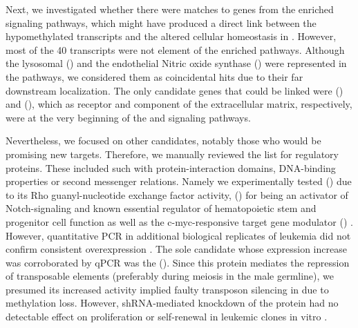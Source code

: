 Next, we investigated whether there were matches to genes from the enriched signaling pathways, which might have produced a direct link between the hypomethylated transcripts and the altered cellular homeostasis in \dnmtchip. However, most of the \num{40} transcripts were not element of the enriched pathways. Although the lysosomal () and the endothelial Nitric oxide synthase () were represented in the pathways, we considered them as coincidental hits due to their far downstream localization. The only candidate genes that could be linked were () and (), which as receptor and component of the extracellular matrix, respectively, were at the very beginning of the  and  signaling pathways.

Nevertheless, we focused on other candidates, notably those who would be promising new targets. Therefore, we manually reviewed the list for regulatory proteins. These included such with protein-interaction domains, DNA-binding properties or second messenger relations. Namely we experimentally tested () due to its Rho guanyl-nucleotide exchange factor activity, () for being an activator of Notch-signaling and known essential regulator of hematopoietic stem and progenitor cell function\cite{Gupta2007} as well as the c-myc-responsive target gene modulator () \cite{Yin1999}. However, quantitative PCR in additional biological replicates of \dnmtchip \mllafnine \kithi leukemia did not confirm consistent overexpression \dns. The sole candidate whose expression increase was corroborated by qPCR was the (). Since this protein mediates the repression of transposable elements (preferably during meiosis in the male germline)\cite{Wenda2017}, we presumed its increased activity implied faulty transposon silencing in \dnmtchip due to methylation loss. However, shRNA-mediated knockdown of the protein had no detectable effect on proliferation or self-renewal in \mllafnine leukemic clones in vitro \dns. 

